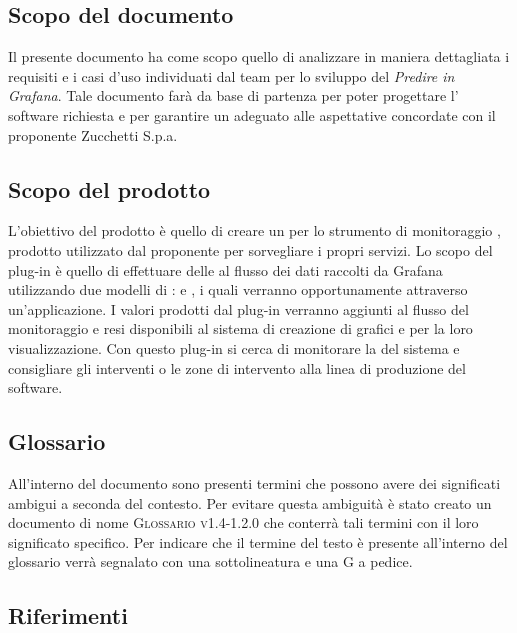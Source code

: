 \documentclass[../analisi-dei-requisiti.tex]{subfiles}
\begin{document}
\subsection{Scopo del documento}%
\label{subs:scopo_del_documento}
Il presente documento ha come scopo quello di analizzare in maniera dettagliata i requisiti e i casi d'uso individuati dal team per lo sviluppo del  \emph{Predire in Grafana}. Tale documento farà da base di partenza per poter progettare l' software richiesta e per garantire un  adeguato alle aspettative concordate con il proponente Zucchetti S.p.a.

\subsection{Scopo del prodotto}%
\label{subs:scopo_del_prodotto}
L'obiettivo del prodotto è quello di creare un  per lo strumento di monitoraggio , prodotto utilizzato dal proponente per sorvegliare i propri servizi. Lo scopo del plug-in è quello di effettuare delle  al flusso dei dati raccolti da Grafana utilizzando due modelli di :  e , i quali verranno opportunamente  attraverso un'applicazione. I valori prodotti dal plug-in verranno aggiunti al flusso del monitoraggio e resi disponibili al sistema di creazione di grafici e  per la loro visualizzazione. Con questo plug-in si cerca di monitorare la  del sistema e consigliare gli interventi o le zone di intervento alla linea di produzione del software.

\subsection{Glossario}
\label{subs:glossario}
All'interno del documento sono presenti termini che possono avere dei significati ambigui a seconda del contesto. Per evitare questa ambiguità è stato creato un documento di nome \textsc{Glossario v1.4-1.2.0} che conterrà tali termini con il loro significato specifico. Per indicare che il termine del testo è presente all'interno del glossario verrà segnalato con una sottolineatura e una G a pedice.

\subsection{Riferimenti}
\label{subs:riferimenti}
\end{document}
